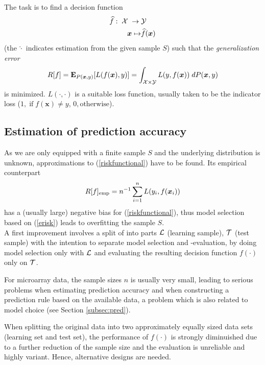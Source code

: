 The task is to find a decision function
\begin{align*}
\begin{split}
\widehat{f}: \; \mathcal X\; \rightarrow \; & \mathcal Y  \\
\bm{x} \mapsto & \widehat{f}(\bm{x})
\end{split}
\end{align*}
(the $\widehat{\cdot}$ indicates estimation from the given sample $S$) 
such that the \emph{generalization error}
\begin{equation}\label{riskfunctional}
R[f] = \textbf{E}_{P(\bm{x},y)}[L(f(\bm{x}), y)] = \int_{\mathcal X \times \mathcal Y}  L(y, f(\bm{x})) \; d P(\bm{x},y)
\end{equation}
is minimized.  
$L(\cdot, \cdot)$ is a suitable loss function, usually taken to
be the indicator loss ($1, \; \text{if} \; f(\bm{x}) \neq y$, $0, \text{otherwise}$).

\subsection{Estimation of prediction accuracy}

As we are only equipped with a finite sample $S$ and the underlying distribution
is unknown, approximations to (\ref{riskfunctional}) have to be found. Its
empirical counterpart
\begin{equation}\label{erisk}
R[f]_{\text{emp}} = n^{-1} \sum_{i=1}^n L(y_i, f(\bm{x}_i))
\end{equation}
has a (usually large) negative bias for (\ref{riskfunctional}), thus model
selection based on (\ref{erisk}) leads to overfitting the sample $S$.\\
A first improvement involves a split of into parts $\mathcal L$ (learning sample),
$\mathcal T$ (test sample) with the intention to separate model selection and
-evaluation, by doing model selection only with $\mathcal L$ and evaluating the
resulting decision function $f(\cdot)$ only on $\mathcal T$.

For microarray data, the sample sizes $n$ is usually very small, leading to 
serious problems when estimating prediction accuracy 
and when constructing a prediction rule based on the available data, a problem which is also
related to model choice (see Section \ref{subsec:pred}). 

When splitting the original data into two approximately equally sized 
data sets (learning set and test set), the performance
of $f(\cdot)$ is strongly diminuished due to a further reduction of the sample
size and the evaluation is unreliable and highly variant. Hence, alternative
designs are needed.

